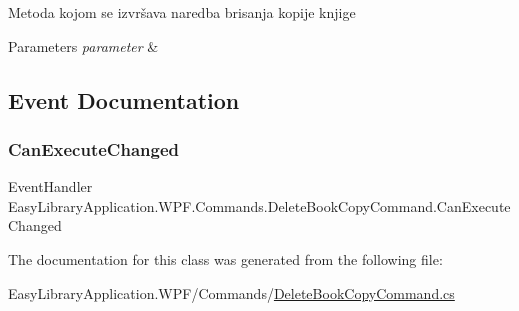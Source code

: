 Metoda kojom se izvršava naredba brisanja kopije knjige 


\begin{DoxyParams}{Parameters}
{\em parameter} & \\
\hline
\end{DoxyParams}


\subsection{Event Documentation}
\mbox{\label{class_easy_library_application_1_1_w_p_f_1_1_commands_1_1_delete_book_copy_command_ae97362a583ad850d0ca6a1172243916b}} 
\subsubsection{\texorpdfstring{Can\+Execute\+Changed}{CanExecuteChanged}}
{\footnotesize\ttfamily Event\+Handler Easy\+Library\+Application.\+W\+P\+F.\+Commands.\+Delete\+Book\+Copy\+Command.\+Can\+Execute\+Changed}



The documentation for this class was generated from the following file\+:\begin{DoxyCompactItemize}
\item 
Easy\+Library\+Application.\+W\+P\+F/\+Commands/\mbox{\hyperlink{_delete_book_copy_command_8cs}{Delete\+Book\+Copy\+Command.\+cs}}\end{DoxyCompactItemize}
